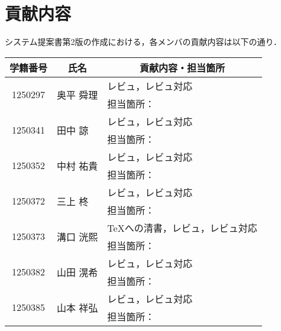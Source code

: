 \chapter{貢献内容}
システム提案書第2版の作成における，各メンバの貢献内容は以下の通り．
\begin{table}[h]
    \centering
    \begin{tabularx}{\textwidth}{cll}
        \multicolumn{1}{c}{学籍番号} & \multicolumn{1}{c}{氏名} & \multicolumn{1}{c}{貢献内容・担当箇所} \\
        \hline
        \multirow{2}{*}{1250297} & \multirow{2}{*}{奥平 舜理} & レビュ，レビュ対応                     \\
                                 &                        & 担当箇所：                         \\
        \hline
        \multirow{2}{*}{1250341} & \multirow{2}{*}{田中 諒}  & レビュ，レビュ対応                     \\
                                 &                        & 担当箇所：                         \\
        \hline
        \multirow{2}{*}{1250352} & \multirow{2}{*}{中村 祐貴} & レビュ，レビュ対応                     \\
                                 &                        & 担当箇所：                         \\
        \hline
        \multirow{2}{*}{1250372} & \multirow{2}{*}{三上 柊}  & レビュ，レビュ対応                     \\
                                 &                        & 担当箇所：                         \\
        \hline
        \multirow{2}{*}{1250373} & \multirow{2}{*}{溝口 洸熙} & \TeX への清書，レビュ，レビュ対応           \\
                                 &                        & 担当箇所：                         \\
        \hline
        \multirow{2}{*}{1250382} & \multirow{2}{*}{山田 滉希} & レビュ，レビュ対応                     \\
                                 &                        & 担当箇所：                         \\
        \hline
        \multirow{2}{*}{1250385} & \multirow{2}{*}{山本 祥弘} & レビュ，レビュ対応                     \\
                                 &                        & 担当箇所：                         \\
        \hline
    \end{tabularx}
\end{table}
